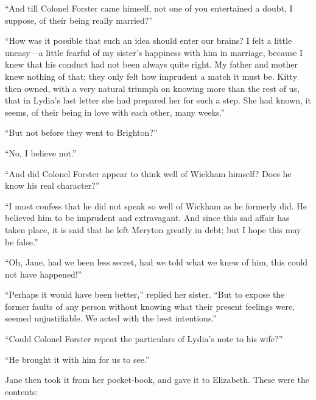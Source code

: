 \documentclass[12pt,english,oneside]{book}
\begin{document}
{}``And till Colonel Forster came himself, not one of you entertained
a doubt, I suppose, of their being really married?''\ 

{}``How was it possible that such an idea should enter our brains?
I felt a little uneasy\mbox{---}a little fearful of my sister's happiness
with him in marriage, because I knew that his conduct had not been
always quite right. My father and mother knew nothing of that; they
only felt how imprudent a match it must be. Kitty then owned, with
a very natural triumph on knowing more than the rest of us, that in
Lydia's last letter she had prepared her for such a step. She had
known, it seems, of their being in love with each other, many weeks.''

{}``But not before they went to Brighton?''\ 

{}``No, I believe not.''

{}``And did Colonel Forster appear to think well of Wickham himself?
Does he know his real character?''\ 

{}``I must confess that he did not speak so well of Wickham as he
formerly did. He believed him to be imprudent and extravagant. And
since this sad affair has taken place, it is said that he left Meryton
greatly in debt; but I hope this may be false.''

{}``Oh, Jane, had we been less secret, had we told what we knew of
him, this could not have happened!''\ 

{}``Perhaps it would have been better,'' replied her sister. {}``But
to expose the former faults of any person without knowing what their
present feelings were, seemed unjustifiable. We acted with the best
intentions.''

{}``Could Colonel Forster repeat the particulars of Lydia's note
to his wife?''\ 

{}``He brought it with him for us to see.''

Jane then took it from her pocket-book, and gave it to Elizabeth.
These were the contents:
\end{document}
